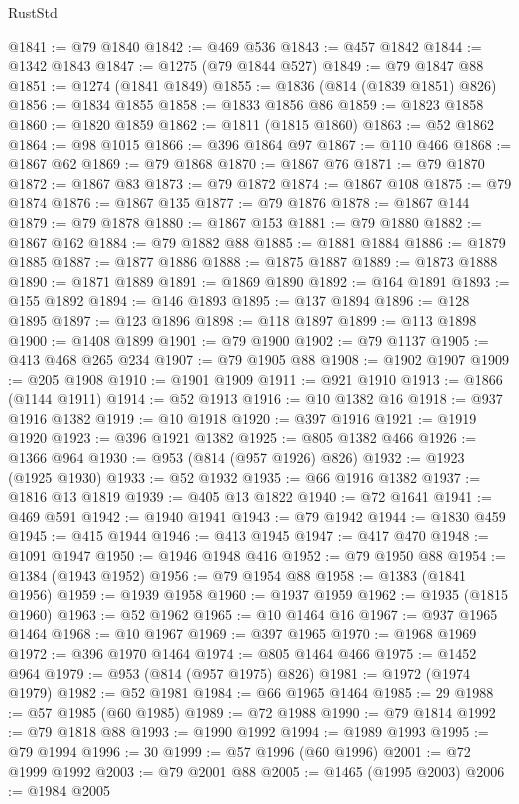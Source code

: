 \begin{lexlean}{RustStd}
\begin{coremodule}
@1841 := @79 @1840
@1842 := @469 @536
@1843 := @457 @1842
@1844 := @1342 @1843
@1847 := @1275 (@79 @1844 @527)
@1849 := @79 @1847 @88
@1851 := @1274 (@1841 @1849)
@1855 := @1836 (@814 (@1839 @1851) @826)
@1856 := @1834 @1855
@1858 := @1833 @1856 @86
@1859 := @1823 @1858
@1860 := @1820 @1859
@1862 := @1811 (@1815 @1860)
@1863 := @52 @1862
@1864 := @98 @1015
@1866 := @396 @1864 @97
@1867 := @110 @466
@1868 := @1867 @62
@1869 := @79 @1868
@1870 := @1867 @76
@1871 := @79 @1870
@1872 := @1867 @83
@1873 := @79 @1872
@1874 := @1867 @108
@1875 := @79 @1874
@1876 := @1867 @135
@1877 := @79 @1876
@1878 := @1867 @144
@1879 := @79 @1878
@1880 := @1867 @153
@1881 := @79 @1880
@1882 := @1867 @162
@1884 := @79 @1882 @88
@1885 := @1881 @1884
@1886 := @1879 @1885
@1887 := @1877 @1886
@1888 := @1875 @1887
@1889 := @1873 @1888
@1890 := @1871 @1889
@1891 := @1869 @1890
@1892 := @164 @1891
@1893 := @155 @1892
@1894 := @146 @1893
@1895 := @137 @1894
@1896 := @128 @1895
@1897 := @123 @1896
@1898 := @118 @1897
@1899 := @113 @1898
@1900 := @1408 @1899
@1901 := @79 @1900
@1902 := @79 @1137
@1905 := @413 @468 @265 @234
@1907 := @79 @1905 @88
@1908 := @1902 @1907
@1909 := @205 @1908
@1910 := @1901 @1909
@1911 := @921 @1910
@1913 := @1866 (@1144 @1911)
@1914 := @52 @1913
@1916 := @10 @1382 @16
@1918 := @937 @1916 @1382
@1919 := @10 @1918
@1920 := @397 @1916
@1921 := @1919 @1920
@1923 := @396 @1921 @1382
@1925 := @805 @1382 @466
@1926 := @1366 @964
@1930 := @953 (@814 (@957 @1926) @826)
@1932 := @1923 (@1925 @1930)
@1933 := @52 @1932
@1935 := @66 @1916 @1382
@1937 := @1816 @13 @1819
@1939 := @405 @13 @1822
@1940 := @72 @1641
@1941 := @469 @591
@1942 := @1940 @1941
@1943 := @79 @1942
@1944 := @1830 @459
@1945 := @415 @1944
@1946 := @413 @1945
@1947 := @417 @470
@1948 := @1091 @1947
@1950 := @1946 @1948 @416
@1952 := @79 @1950 @88
@1954 := @1384 (@1943 @1952)
@1956 := @79 @1954 @88
@1958 := @1383 (@1841 @1956)
@1959 := @1939 @1958
@1960 := @1937 @1959
@1962 := @1935 (@1815 @1960)
@1963 := @52 @1962
@1965 := @10 @1464 @16
@1967 := @937 @1965 @1464
@1968 := @10 @1967
@1969 := @397 @1965
@1970 := @1968 @1969
@1972 := @396 @1970 @1464
@1974 := @805 @1464 @466
@1975 := @1452 @964
@1979 := @953 (@814 (@957 @1975) @826)
@1981 := @1972 (@1974 @1979)
@1982 := @52 @1981
@1984 := @66 @1965 @1464
@1985 := 29
@1988 := @57 @1985 (@60 @1985)
@1989 := @72 @1988
@1990 := @79 @1814
@1992 := @79 @1818 @88
@1993 := @1990 @1992
@1994 := @1989 @1993
@1995 := @79 @1994
@1996 := 30
@1999 := @57 @1996 (@60 @1996)
@2001 := @72 @1999 @1992
@2003 := @79 @2001 @88
@2005 := @1465 (@1995 @2003)
@2006 := @1984 @2005

\end{coremodule}
\end{lexlean}
